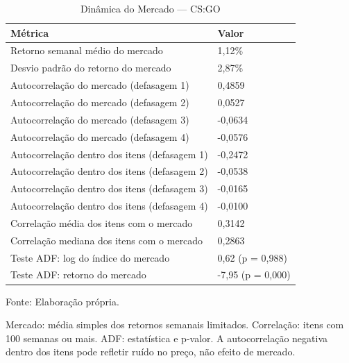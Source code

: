 \begin{table}[H]
\caption{Dinâmica do Mercado — CS:GO}\label{tab:dynamics} 

\fontsize{12.0pt}{14.4pt}\selectfont

\begin{tabular*}{\linewidth}{@{\extracolsep{\fill}}ll}
\toprule
\textbf{Métrica} & \textbf{Valor} \\
\midrule\addlinespace[2.5pt]
Retorno semanal médio do mercado & 1,12\% \\
Desvio padrão do retorno do mercado & 2,87\% \\
Autocorrelação do mercado (defasagem 1) & 0,4859 \\
Autocorrelação do mercado (defasagem 2) & 0,0527 \\
Autocorrelação do mercado (defasagem 3) & -0,0634 \\
Autocorrelação do mercado (defasagem 4) & -0,0576 \\
Autocorrelação dentro dos itens (defasagem 1) & -0,2472 \\
Autocorrelação dentro dos itens (defasagem 2) & -0,0538 \\
Autocorrelação dentro dos itens (defasagem 3) & -0,0165 \\
Autocorrelação dentro dos itens (defasagem 4) & -0,0100 \\
Correlação média dos itens com o mercado & 0,3142 \\
Correlação mediana dos itens com o mercado & 0,2863 \\
Teste ADF: log do índice do mercado & 0,62 (p = 0,988) \\
Teste ADF: retorno do mercado & -7,95 (p = 0,000) \\
\bottomrule
\end{tabular*}
\par\vspace{\belowcaptionskip}\footnotesize Fonte: Elaboração própria.\par
\begin{minipage}{\linewidth}
Mercado: média simples dos retornos semanais limitados. Correlação: itens com 100 semanas ou mais. ADF: estatística e p-valor. A autocorrelação negativa dentro dos itens pode refletir ruído no preço, não efeito de mercado.\\
\end{minipage}
\end{table}
